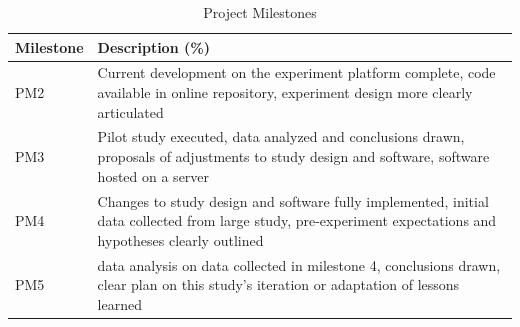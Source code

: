 \begin{table}[h]
 \caption{Project Milestones}\vspace{1ex} %
 \label{tab:milestones}
 \scriptsize
 \centering %
   \begin{tabular}{l|p{.75\linewidth}}
     Milestone & Description (\%)\\
   \hline
     PM2 & Current development on the experiment platform complete, code available in online repository, experiment design more clearly articulated\\
     PM3 & Pilot study executed, data analyzed and conclusions drawn, proposals of adjustments to study design and software, software hosted on a server\\
     PM4 & Changes to study design and software fully implemented, initial data collected from large study, pre-experiment expectations and hypotheses clearly outlined\\
     PM5 & data analysis on data collected in milestone 4, conclusions drawn, clear plan on this study's iteration or adaptation of lessons learned\\
   \end{tabular}
\end{table}

